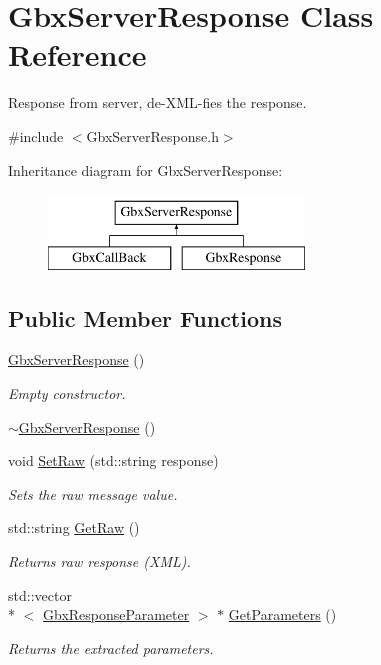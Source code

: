 \hypertarget{classGbxServerResponse}{\section{Gbx\-Server\-Response Class Reference}
\label{classGbxServerResponse}
}


Response from server, de-\/\-X\-M\-L-\/fies the response.  




{\ttfamily \#include $<$Gbx\-Server\-Response.\-h$>$}

Inheritance diagram for Gbx\-Server\-Response\-:\begin{figure}[H]
\begin{center}
\leavevmode
\includegraphics[height=2.000000cm]{classGbxServerResponse}
\end{center}
\end{figure}
\subsection*{Public Member Functions}
\begin{DoxyCompactItemize}
\item 
\hyperlink{classGbxServerResponse_a2198b6f6ca6b7da1ffd7bfa9a516d8b2}{Gbx\-Server\-Response} ()
\begin{DoxyCompactList}\small\item\em Empty constructor. \end{DoxyCompactList}\item 
\hyperlink{classGbxServerResponse_ad2a02192f5389a0fe10ea27cb24adedc}{$\sim$\-Gbx\-Server\-Response} ()
\item 
void \hyperlink{classGbxServerResponse_a178871bec787d490f69def87f0242e05}{Set\-Raw} (std\-::string response)
\begin{DoxyCompactList}\small\item\em Sets the raw message value. \end{DoxyCompactList}\item 
std\-::string \hyperlink{classGbxServerResponse_aa449d9a63899e1d1205e6ab916798ba6}{Get\-Raw} ()
\begin{DoxyCompactList}\small\item\em Returns raw response (X\-M\-L). \end{DoxyCompactList}\item 
std\-::vector\\*
$<$ \hyperlink{classGbxResponseParameter}{Gbx\-Response\-Parameter} $>$ $\ast$ \hyperlink{classGbxServerResponse_ab791b8d9edb964b909d3c70753549668}{Get\-Parameters} ()
\begin{DoxyCompactList}\small\item\em Returns the extracted parameters. \end{DoxyCompactList}\end{DoxyCompactItemize}
